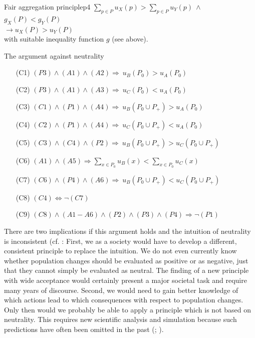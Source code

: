 \begin{Premise}{Fair aggregation principle}{p4}
  \hspace*{.5cm} $
    \sum_{p\in P} u_X(p) > \sum_{p\in P} u_Y(p) \ \wedge
  $ \\
  \hspace*{.5cm} $g_X(P) < g_Y(P)
  $ \\
  $
    \rightarrow u_X(P) > u_Y(P)
  $ \\
  with suitable inequality function $g$ (see above).
\end{Premise}

\begin{Proof}{The argument against neutrality}{}
\begin{enumerate}
\item[(C1)]
$(P3) \wedge (A1) \wedge (A2) \Rightarrow \ u_B(P_0) > u_A(P_0)$
\item[(C2)]
$(P3) \wedge (A1) \wedge (A3) \Rightarrow \ u_C(P_0) < u_A(P_0)$
\item[(C3)]
$(C1) \wedge (P1) \wedge (A4) \Rightarrow \ u_B(P_0 \cup P_+) > u_A(P_0)$
\item[(C4)]
$(C2) \wedge (P1) \wedge (A4) \Rightarrow \ u_C(P_0 \cup P_+) < u_A(P_0)$
\item[(C5)]
$(C3) \wedge (C4) \wedge (P2) \Rightarrow \ u_B(P_0 \cup P_+) > u_C(P_0 \cup P_+)$
\item[(C6)]
$(A1) \wedge (A5) \Rightarrow \sum_{x\in P_0} u_B(x) < \sum_{x \in P_0} u_C(x)$
\item[(C7)]
$(C6) \wedge (P4) \wedge (A6) \Rightarrow  \ u_B(P_0 \cup P_+) < u_C(P_0 \cup P_+)$
\item[(C8)]
$(C4) \Leftrightarrow \neg (C7)$
\item[(C9)]
$(C8) \wedge (A1-A6) \wedge (P2) \wedge (P3) \wedge (P4) \Rightarrow \neg (P1)$
\end{enumerate}
\end{Proof}

There are two implications if this argument holds and the intuition of neutrality is inconsistent (cf. : First, we as a society would have to develop a different, consistent principle to replace the intuition. We do not even currently know whether population changes should be evaluated as positive or as negative, just that they cannot simply be evaluated as neutral. The finding of a new principle with wide acceptance would certainly present a major societal task and require many years of discourse. Second, we would need to gain better knowledge of which actions lead to which consequences with respect to population changes. Only then would we probably be able to apply a principle which is not based on neutrality. This requires new scientific analysis and simulation because such predictions have often been omitted in the past (; ). 

